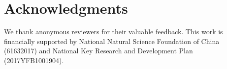 \section*{Acknowledgments}

We thank anonymous reviewers for their valuable feedback.
This work is financially supported by National Natural Science Foundation of China (61632017) and National Key Research and Development Plan (2017YFB1001904).